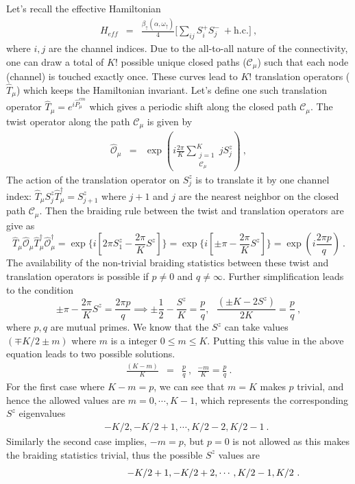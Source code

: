 \documentclass[reprint,onecolumn,prb,superscriptaddress]{revtex4-2}
\begin{document}
Let's recall the effective Hamiltonian
\begin{eqnarray}
H_{eff} &=& \frac{\beta_{\uparrow}(\alpha,\omega_{\uparrow})}{4} \bigg[ \displaystyle\sum_{ij} S_i^+S_j^- ~+ \textrm{h.c.} \bigg]~,
\end{eqnarray}
where $i,j$ are the channel indices. Due to the all-to-all nature of the connectivity, one can draw a total of $K!$ possible unique closed paths ($\mathcal{C}_{\mu}$) such that each node (channel) is touched exactly once. These curves lead to $K!$ translation operators ($\hat{T}_{\mu}$) which keeps the Hamiltonian invariant. Let's define one such translation operator $\hat{T}_{\mu}=e^{i\hat{P}^{cm}_{{\mu}}}$ which gives a periodic shift along the closed path $\mathcal{C}_{\mu}$. The twist operator along the path $\mathcal{C}_{\mu}$ is given by
\begin{eqnarray}
\hat{\mathcal{O}}_{\mu} &=& \exp({i\frac{2\pi}{K} \displaystyle\sum_{\substack{j=1\\ \mathcal{C}_{\mu}}}^{K} j S_j^z} )~,
\end{eqnarray}
The action of the translation operator on \(S_j^z\) is to translate it by one channel index: $\hat{T}_{\mu} S_j^z \hat T^\dagger_\mu = S_{j+1}^z$ where $j+1$ and $j$ are the nearest neighbor on the closed path $\mathcal{C}_{\mu}$. Then the braiding rule between the twist and translation operators are give as
\begin{equation}
\hat{T}_{\mu}\hat{\mathcal{O}}_{\mu} \hat{T}^{\dagger}_{\mu} \hat{\mathcal{O}}_{\mu}^{\dagger} = \exp\{i[2\pi S_1^z-\frac{2\pi}{K}S^z]\} = \exp\{i[\pm \pi - \frac{2\pi}{K} S^z]\} =\exp(i\frac{2\pi p}{q})~.
\end{equation}
The availability of the non-trivial braiding statistics between these twist and translation operators is possible if $p\neq 0$ and $q\neq \infty$. Further simplification leads to the condition
\begin{equation}
 \pm\pi -\frac{2\pi}{K} S^z = \frac{2\pi p}{q} \implies  \pm\frac{1}{2}-\frac{S^z}{K} = \frac{p}{q} , ~ ~ ~ \frac{(\pm K-2S^z)}{2K} = \frac{p}{q}~,
\end{equation} 
where $p,q$ are mutual primes. We know that the $S^z$ can take values $(\mp K/2\pm m)$ where $m$ is a integer $0 \leq m \leq K$. Putting this value in the above equation leads to two possible solutions.
\begin{eqnarray}
\frac{(K-m)}{K} &=& \frac{p}{q} ~,~~ \frac{-m}{K}=\frac{p}{q}~.
\end{eqnarray}
For the first case where $K-m=p$, we can see that $m=K$ makes $p$ trivial, and hence the allowed values are $m=0,\cdots,K-1$, which represents the corresponding $S^z$ eigenvalues 
\begin{eqnarray}
&&-K/2,-K/2+1,\cdots,K/2-2,K/2-1~.
\end{eqnarray}
Similarly the second case implies, $-m=p$, but $p=0$ is not allowed as this makes the braiding statistics trivial, thus the possible $S^z$ values are 
\begin{eqnarray}
&&\hspace{2.2cm} -K/2+1,-K/2+2,\cdots,K/2-1,K/2~.
\end{eqnarray}
\end{document}
